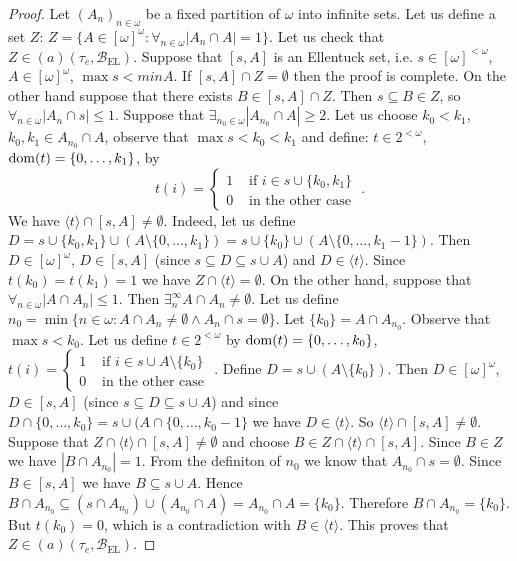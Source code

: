 \documentclass[12pt]{amsart}
\theoremstyle{plain}
\theoremstyle{definition}
\theoremstyle{remark}
\newcommand{\dom}{{\rm dom}}
\newcommand{\finsub}{[\omega]^{<\omega}}
\newcommand{\infsub}{[\omega]^{\omega}}
\newcommand{\cB}{{\mathcal B}}
\newcommand{\aideal}{\mathit{(a)}}
\newcommand{\baseEllentuck}{\cB_{\mathrm{EL}}}
\newcommand{\ninomega}{n\in\omega}
\begin{document}
\begin{proof}
Let $(A_n)_{n\in\omega}$ be a fixed partition of $\omega$ into infinite sets. 
Let us define a set $Z$:
$Z = \lbrace A\in\infsub \colon \forall_{n\in\omega} |A_n \cap A| = 1\rbrace$.
Let us check that $Z\in\aideal(\tau_e, \baseEllentuck)$.
Suppose that $[s, A]$ is an Ellentuck set, i.e. $s\in\finsub$, $A\in\infsub$, $\max s < min A$. 
If $[s, A] \cap Z = \emptyset$ then
the proof is complete. On the other hand suppose that there exists $B \in [s, A] \cap Z$. Then $s \subseteq B \in Z$, so $\forall_{
\ninomega} |A_n \cap s| \leq 1$.
Suppose that $\exists_{n_0\in\omega} |A_{n_0} \cap A| \geq 2$. Let us choose $k_0 < k_1$, $k_0, k_1 \in A_{n_0} \cap A$, observe that $\max s < k_0 < k_1$ and define:
$t \in 2^{<\omega}$, 
$\dom(t) = \lbrace 0, \ldots, k_1\rbrace$, by  
\[t(i) = \begin{cases}
     1 & \text{ if } i \in s \cup \lbrace k_0, k_1 \rbrace \\
     0 & \text{ in the other case }
\end{cases}.\]
We have $\langle t \rangle \cap [s, A] \not= \emptyset$. Indeed, let us define $D = s \cup \lbrace k_0, k_1 \rbrace \cup (A \setminus \lbrace 0, \ldots, k_1\rbrace) = 
s \cup \lbrace k_0 \rbrace \cup (A \setminus \lbrace 0, \ldots, k_1 - 1\rbrace)$.
Then $D \in \infsub$, $D \in [s, A]$ (since $s \subseteq D \subseteq s \cup A$) and $D \in \langle t \rangle$. Since $t(k_0) = t(k_1) = 1$ we have $Z \cap \langle t \rangle = \emptyset$.
On the other hand, suppose that $\forall_{\ninomega} |A \cap A_n| \leq 1$. Then $\exists^\infty_n A \cap A_n \not= \emptyset$.
Let us define 
$n_0 = \min\lbrace \ninomega \colon A \cap A_n \not= \emptyset \wedge A_n \cap s = \emptyset \rbrace$.
Let $\lbrace k_0 \rbrace = A \cap A_{n_0}$. Observe that $\max s < k_0$. Let us define $t \in 2^{<\omega}$ by $\dom(t) = \lbrace 0, \ldots, k_0\rbrace$, 
$t(i) = \begin{cases}
     1 & \text{ if } i \in s \cup A \setminus \lbrace k_0 \rbrace \\
     0 & \text{ in the other case }
\end{cases}$.
Define $D = s \cup (A \setminus \lbrace k_0 \rbrace)$. Then $D \in \infsub$, $D \in [s, A]$ (since $s \subseteq D \subseteq s \cup A$) and since $D \cap \lbrace 0, \ldots, k_0 \rbrace = s \cup (A \cap \lbrace 0, \ldots, k_0 - 1 \rbrace$ we have $D \in \langle t \rangle$. So $\langle t \rangle \cap [s, A] \not= \emptyset$. Suppose that $Z \cap \langle t \rangle \cap [s, A] \not= \emptyset$ and choose $B \in Z \cap \langle t \rangle \cap [s, A]$. Since $B \in Z$ we have $|B \cap A_{n_0}| = 1$. From the definiton of $n_0$ we know that $A_{n_0} \cap s = \emptyset$. Since $B \in [s, A]$ we have $B \subseteq s \cup A$. Hence $B \cap A_{n_0} \subseteq (s \cap A_{n_0}) \cup (A_{n_0} \cap A) = A_{n_0} \cap A = \lbrace k_0 \rbrace$. Therefore $B \cap A_{n_0} = \lbrace k_0 \rbrace$. But $t(k_0) = 0$, which is a contradiction with $B \in \langle t \rangle$.
This proves that 
$Z \in \aideal(\tau_e, \baseEllentuck)$.


\end{proof}
\end{document}
